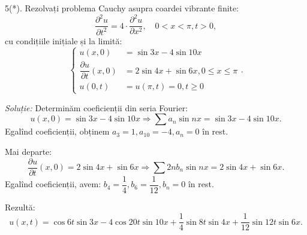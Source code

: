 \vspace{0.3cm}

5(*). Rezolvați problema Cauchy asupra coardei vibrante finite:
\[
  \dfrac{\partial^2 u}{\partial t^2} = 4 \cdot \dfrac{\partial^2 u}{\partial x^2}, %
  \quad 0 < x < \pi, t > 0,
\]
cu condițiile inițiale și la limită:
\[
  \begin{cases}
    u(x, 0) &= \sin 3x - 4 \sin 10x \\
    \dfrac{\partial u}{\partial t}(x, 0) &= 2 \sin 4x + \sin 6x, 0 \leq x \leq \pi \\
    u(0, t) &= u(\pi, t) = 0, t \geq 0
  \end{cases}.
\]

\vspace{0.3cm}

\emph{Soluție:} Determinăm coeficienții din seria Fourier:
\[
  u(x, 0) = \sin 3x - 4\sin 10x \Rightarrow \sum a_n \sin nx = \sin 3x - 4 \sin 10x.
\]
Egalînd coeficienții, obținem $ a_3 = 1, a_{10} = -4, a_n = 0 $ în rest.

Mai departe:
\[
  \dfrac{\partial u}{\partial t}(x, 0) = 2\sin 4x + \sin 6x \Rightarrow %
  \sum 2nb_n \sin nx = 2\sin 4x + \sin 6x.
\]
Egalînd coeficienții, avem: $ b_4 = \dfrac{1}{4}, b_6 = \dfrac{1}{12}, b_n = 0 $ în rest.

Rezultă:
\[
  u(x, t) = \cos 6t \sin 3x - 4\cos 20t \sin 10x + \dfrac{1}{4} \sin 8t \sin 4x + %
  \dfrac{1}{12} \sin 12t \sin 6x.
\]

\vspace{0.3cm}


